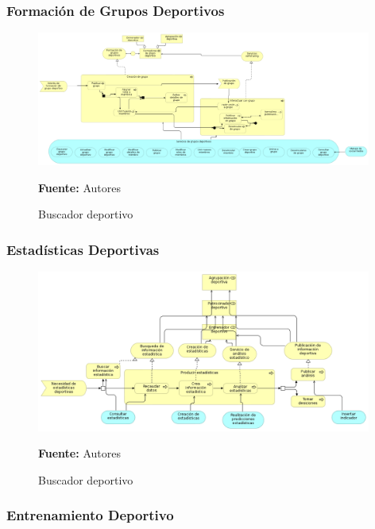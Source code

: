 \subsubsection{Formación de Grupos Deportivos}

\begin{figure}[!htb]
  \begin{center}
    \includegraphics[width=11cm]{./imagenes/business_process/formaciongruposdeportivos.png}
    \caption{Buscador deportivo}
    \label{fig:BF_BuscadorDeportivo}
    \textbf{Fuente:}  Autores
  \end{center}
\end{figure}

\clearpage

\subsubsection{Estadísticas Deportivas}

\begin{figure}[!htb]
  \begin{center}
    \includegraphics[width=11cm]{./imagenes/business_process/estadisticasdeportivas.png}
    \caption{Buscador deportivo}
    \label{fig:BF_BuscadorDeportivo}
    \textbf{Fuente:}  Autores
  \end{center}
\end{figure}

\subsubsection{Entrenamiento Deportivo}

